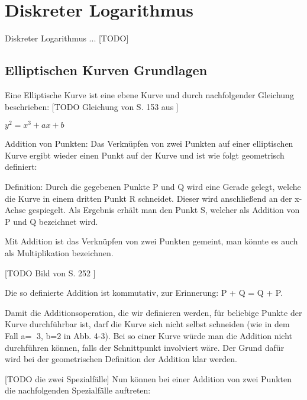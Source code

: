 \section{Diskreter Logarithmus}
	Diskreter Logarithmus ... [TODO]
	
	\subsection{Elliptischen Kurven Grundlagen}
		
		Eine Elliptische Kurve ist eine ebene Kurve und durch nachfolgender Gleichung beschrieben: [TODO Gleichung von S. 153 aus \cite{Kryptographie:und:IT-Sicherheit}] 
		
		$y^2 = x^3 + ax +b$
		
		Addition von Punkten: Das Verknüpfen von zwei Punkten auf einer elliptischen Kurve ergibt wieder einen Punkt auf der Kurve und ist wie folgt geometrisch definiert:
		
		Definition: Durch die gegebenen Punkte P und Q wird eine Gerade gelegt, welche die Kurve in 
		einem dritten Punkt R schneidet. Dieser wird anschließend an der x-Achse 
		gespiegelt. Als Ergebnis erhält man den Punkt S, welcher als Addition von P und Q 
		bezeichnet wird. \cite{Information:und:Kommunikation}
		
		Mit Addition ist das Verknüpfen von zwei Punkten gemeint, man könnte es auch als Multiplikation bezeichnen.\cite{Information:und:Kommunikation}
		
		[TODO Bild von S. 252 \cite{Information:und:Kommunikation}]
		
		
		Die so definierte Addition ist kommutativ, zur Erinnerung: P + Q = Q + P.
		
		Damit die Additionsoperation, die wir definieren werden, für beliebige Punkte 
		der Kurve durchführbar ist, darf die Kurve sich nicht selbst schneiden (wie in dem Fall a= 3, 
		b=2 in Abb. 4-3). Bei so einer Kurve würde man die Addition nicht durchführen können, falls 
		der Schnittpunkt involviert wäre. Der Grund dafür wird bei der geometrischen Definition der 
		Addition  klar werden.\cite{Kryptographie:und:IT-Sicherheit}
		
		
		
		[TODO die zwei Spezialfälle]
		Nun können bei einer Addition von zwei Punkten die nachfolgenden Spezialfälle auftreten:
		
